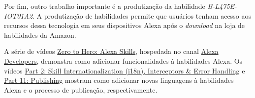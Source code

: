 Por fim, outro trabalho importante é a produtização da habilidade \textit{B-L475E-IOT01A2}. A produtização de habilidades permite que usuários tenham acesso aos recursos dessa tecnologia em seus dispositivos Alexa após o \textit{download} na loja de habilidades da Amazon.

A série de vídeos \href{https://www.youtube.com/playlist?list=PLdZn93YfA_1ZP1WFkz6bm08v3zFfWwfGW}{Zero to Hero: Alexa Skills}, hospedada no canal \href{https://www.youtube.com/@AlexaDevelopers}{Alexa Developers}, demonstra como adicionar funcionalidades à habilidades Alexa. Os vídeos \href{https://www.youtube.com/watch?v=NXVmHWZZcjw&list=PLdZn93YfA_1ZP1WFkz6bm08v3zFfWwfGW&index=2}{Part 2: Skill Internationalization (i18n), Interceptors \& Error Handling} e \href{https://www.youtube.com/watch?v=I0fxuQQkLYg&list=PLdZn93YfA_1ZP1WFkz6bm08v3zFfWwfGW&index=11}{Part 11: Publishing} mostram como adicionar novas linguagens à habilidades Alexa e o processo de publicação, respectivamente.
